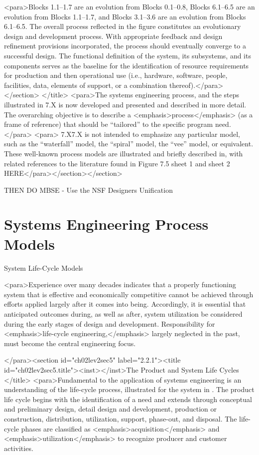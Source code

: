 <para>Blocks 1.1–1.7 are an evolution from Blocks 0.1–0.8, Blocks 6.1–6.5 are an evolution from Blocks 1.1–1.7, and Blocks 3.1–3.6 are an evolution from Blocks 6.1–6.5. The overall process reflected in the figure constitutes an evolutionary design and development process. With appropriate feedback and design refinement provisions incorporated, the process should eventually converge to a successful design. The functional definition of the system, its subsystems, and its components serves as the baseline for the identification of resource requirements for production and then operational use (i.e., hardware, software, people, facilities, data, elements of support, or a combination thereof).</para></section>
</title>
	<para>The systems engineering process, and the steps illustrated in 7.X is now developed and presented and described in more detail. The overarching objective is to describe a <emphasis>process</emphasis> (as a frame of reference) that should be “tailored” to the specific program need.</para>
<para> 7.X7.X is not intended to emphasize any particular model, such as the “waterfall” model, the “spiral” model, the “vee” model, or equivalent. These well-known process models are illustrated and briefly described in, with related references to the literature found in
Figure 7.5 sheet 1 and sheet 2 HERE</para></section></section>

THEN DO MBSE - Use the NSF Designers Unification


\section{Systems Engineering Process Models}

System Life-Cycle Models

<para>Experience over many decades indicates that a properly functioning system that is effective and economically competitive cannot be achieved through efforts applied largely after it comes into being. Accordingly, it is essential that anticipated outcomes during, as well as after, system utilization be considered during the early stages of design and development. Responsibility for <emphasis>life-cycle engineering,</emphasis> largely neglected in the past, must become the central engineering focus.

</para><section id="ch02lev2sec5" label="2.2.1"><title id="ch02lev2sec5.title"><inst></inst>The Product and System Life Cycles
</title>
<para>Fundamental to the application of systems engineering is an understanding of the life-cycle process, illustrated for the system in . The product life cycle begins with the identification of a need and extends through conceptual and preliminary design, detail design and development, production or construction, distribution, utilization, support, phase-out, and disposal. The life-cycle phases are classified as <emphasis>acquisition</emphasis> and <emphasis>utilization</emphasis> to recognize producer and customer activities.

